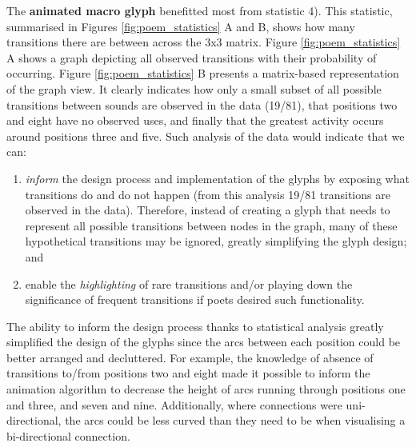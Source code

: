 The \textbf{animated macro glyph} benefitted most from statistic 4). 
This statistic, summarised in Figures \ref{fig:poem_statistics} A and B, shows how many transitions there are between across the 3x3 matrix. 
Figure \ref{fig:poem_statistics} A shows a graph depicting all observed transitions with their probability of occurring.
Figure \ref{fig:poem_statistics} B presents a matrix-based representation of the graph view. 
It clearly indicates how only a small subset of all possible transitions between sounds are observed in the data (19/81), that positions two and eight have no observed uses, and finally that the greatest activity occurs around positions three and five.
Such analysis of the data would indicate that we can:
\begin{enumerate}

\item \emph{inform} the design process and implementation of the glyphs by exposing what transitions do and do not happen (from this analysis 19/81 transitions are observed in the data).
Therefore, instead of creating a glyph that needs to represent all possible transitions between nodes in the graph, many of these hypothetical transitions may be ignored, greatly simplifying the glyph design; and

\item enable the \emph{highlighting} of rare transitions and/or playing down the significance of frequent transitions if poets desired such functionality.

\end{enumerate}

The ability to inform the design process thanks to statistical analysis greatly simplified the design of the glyphs since the arcs between each position could be better arranged and decluttered.
For example, the knowledge of absence of transitions to/from positions two and eight made it possible to inform the animation algorithm to decrease the height of arcs running through positions one and three, and seven and nine. 
Additionally, where connections were uni-directional, the arcs could be less curved than they need to be when visualising a bi-directional connection. 

